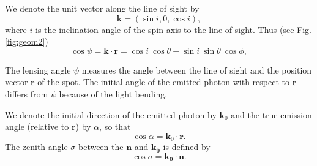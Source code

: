 \documentclass{wihuri}
\def\be{\begin{equation}}
\def\ee{\end{equation}}
\newcommand{\bmath}[1]{\boldsymbol{#1}}
\begin{document}
We denote the unit vector along the line of sight by 
\be
\bmath{k}=(\sin i, 0, \cos i), 
\ee 
where $i$ is the inclination angle of the spin axis to the line of sight. 
Thus (see Fig. \ref{fig:geom2})
\be \label{eq:psi2}
  \cos\psi=\bmath{k}\cdot \bmath{r} = \cos i\ \cos\theta+\sin i\ \sin \theta\ \cos\phi,
\ee

The lensing angle $\psi$ measures the angle between the line of sight and the position vector $\bmath{r}$ of the spot. The initial angle of the emitted photon with respect to
 ${\mathbf r}$ differs from $\psi$ because of the light bending.



We denote the initial direction of the emitted photon by $\bmath{k}_0$ %
and the true emission angle (relative to $\bmath{r}$) by $\alpha$, so that
\be
 \cos\alpha=\bmath{k}_0 \cdot \bmath{r}.
\ee
The zenith angle $\sigma$ between the $\bmath{n}$ and $\bmath{k_{0}}$ is defined by 
\be
\cos\sigma = \bmath{k_{0}}\cdot\bmath{n}.
\ee
\end{document}
